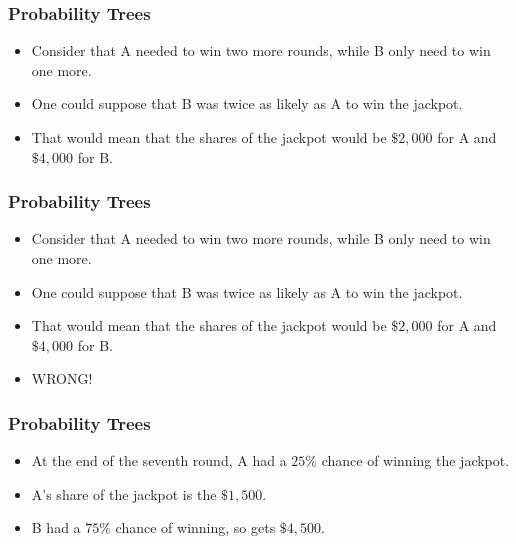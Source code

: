 \documentclass[IntroMain.tex]{subfiles}
\begin{document}
\begin{frame}
\frametitle{Probability Trees}
{  \large 
\vspace{-0.4cm}
\begin{itemize}
\item Consider that A needed to win two more rounds, while B only need to win one more.
\item One could suppose that B was twice as likely as A to win the jackpot.
\item That would mean that the shares of the jackpot would be $\$2,000$ for A and 
$\$4,000$ for B.
\end{itemize}
}
\end{frame}
\begin{frame}
\frametitle{Probability Trees}
{  \large 
\vspace{-0.4cm}
\begin{itemize}
\item Consider that A needed to win two more rounds, while B only need to win one more.
\item One could suppose that B was twice as likely as A to win the jackpot.
\item That would mean that the shares of the jackpot would be $\$2,000$ for A and 
$\$4,000$ for B.
\item \alert{WRONG!}
\end{itemize}
}
\end{frame}
\begin{frame}
\frametitle{Probability Trees}
{  \large 
\vspace{-0.4cm}
\begin{itemize}
\item At the end of the seventh round, A had a $25\%$ chance of winning the jackpot.
\item A's share of the jackpot is  the $\$1,500$.
\item B had a $75\%$ chance of winning, so gets $\$4,500$.
\end{itemize}
}
\end{frame}
\end{document}
